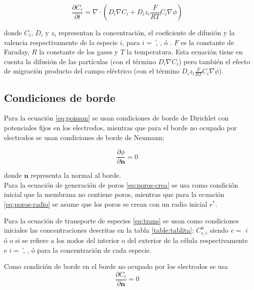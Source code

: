 \begin{equation} \label{eq:trans}
	\frac{\partial C_i}{\partial t} = \nabla \cdot \left( D_i \nabla C_i + D_i z_i \frac{F}{R T} C_i \nabla \phi \right)
\end{equation}

donde $C_i$, $D_i$ y $z_i$ representan la concentración, el coeficiente de difusión y la valencia respectivamente de la especie $i$, para $i = $ \h, \oh, \na ó \cl.
$F$ es la constante de Faraday, $R$ la constante de los gases y $T$ la temperatura. 
Esta ecuación tiene en cuenta la difusión de las partículas (con el término $D_i \nabla C_i$) pero también el efecto de migración producto del campo eléctrico (con el término $D_i z_i \frac{F}{R T} C_i \nabla \phi$). 

\subsection*{Condiciones de borde}
Para la ecuación \ref{eq:poisson} se usan condiciones de borde de Dirichlet con potenciales fijos en los electrodos, mientras que para el borde no ocupado por electrodos se usan condiciones de borde de Neumann:

\begin{equation}
	\frac{\partial \phi}{\partial \mathbf{n}} = 0
\end{equation}

donde $\mathbf{n}$ representa la normal al borde.\\

Para la ecuación de generación de poros \ref{eq:poros-crea} se usa como condición inicial que la membrana no contiene poros, mientras que para la ecuación \ref{eq:poros-radio} se asume que los poros se crean con un radio inicial $r^*$.

Para la ecuación de transporte de especies \ref{eq:trans} se usan como condiciones iniciales las concentraciones descritas en la tabla \ref{table:tablita}: $C_{e, i}^0$ siendo $e =$ $i$ ó $o$ si se refiere a los nodos del interior o del exterior de la célula respectivamente e $i =$ \h, \oh, \na ó \cl{} para la concentración de cada especie. %

Como condición de borde en el borde no ocupado por los electrodos se usa
\begin{equation}
	\frac{\partial C_i}{\partial \mathbf{n}} = 0
\end{equation}


